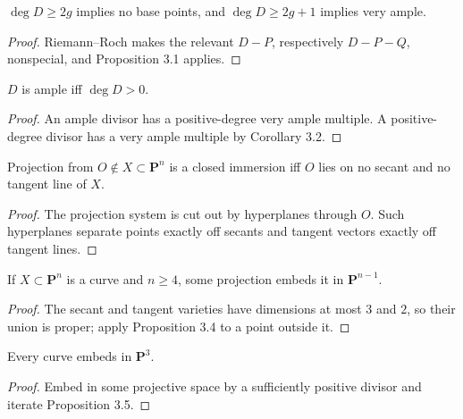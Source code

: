 \begin{corollary}\label{ha-ch4-c32}
\(\deg D\ge2g\) implies no base points, and \(\deg D\ge2g+1\) implies very
ample.
\end{corollary}
\begin{proof}
Riemann--Roch makes the relevant \(D-P\), respectively \(D-P-Q\), nonspecial,
and Proposition 3.1 applies.
\end{proof}

\begin{corollary}\label{ha-ch4-c33}
\(D\) is ample iff \(\deg D>0\).
\end{corollary}
\begin{proof}
An ample divisor has a positive-degree very ample multiple.  A positive-degree
divisor has a very ample multiple by Corollary 3.2.
\end{proof}

\begin{proposition}\label{ha-ch4-p34}
Projection from \(O\notin X\subset\mathbf P^n\) is a closed immersion iff
\(O\) lies on no secant and no tangent line of \(X\).
\end{proposition}
\begin{proof}
The projection system is cut out by hyperplanes through \(O\).  Such
hyperplanes separate points exactly off secants and tangent vectors exactly
off tangent lines.
\end{proof}

\begin{proposition}\label{ha-ch4-p35}
If \(X\subset\mathbf P^n\) is a curve and \(n\ge4\), some projection embeds it
in \(\mathbf P^{n-1}\).
\end{proposition}
\begin{proof}
The secant and tangent varieties have dimensions at most \(3\) and \(2\), so
their union is proper; apply Proposition 3.4 to a point outside it.
\end{proof}

\begin{corollary}\label{ha-ch4-c36}
Every curve embeds in \(\mathbf P^3\).
\end{corollary}
\begin{proof}
Embed in some projective space by a sufficiently positive divisor and iterate
Proposition 3.5.
\end{proof}


